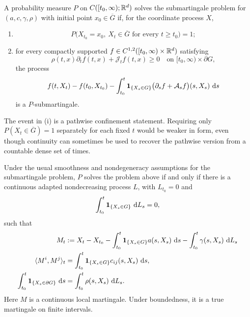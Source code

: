 \begin{definition}
A probability measure $P$ on
$C([t_0,\infty);\mathbb R^d)$ solves the submartingale problem for
$(a,c,\gamma,\rho)$ with initial point $x_0\in\overline G$ if, for the
coordinate process $X$,
\begin{enumerate}[label=(\roman*)]
  \item
  \[
    P\bigl(X_{t_0}=x_0,
      \ X_t\in\overline G\text{ for every }t\geq t_0\bigr)=1;
  \]
  \item for every compactly supported
  $f\in C^{1,2}([t_0,\infty)\times\mathbb R^d)$ satisfying
  \begin{equation}
    \rho(t,x)\partial_t f(t,x)+\mathcal J_t f(t,x)\geq0
    \quad\text{on }[t_0,\infty)\times\partial G, \label{eq:submart-boundary-test}
  \end{equation}
  the process
  \begin{align}
    f(t,X_t)-f(t_0,X_{t_0})
    -\int_{t_0}^t\mathbf 1_{\{X_s\in G\}}
       \bigl(\partial_s f+\mathcal A_s f\bigr)(s,X_s)\,\mathop{}\!\mathrm d s
       \label{eq:submart-process}
  \end{align}
  is a $P$-submartingale.
\end{enumerate}
\end{definition}

The event in (i) is a pathwise confinement statement. Requiring only
$P(X_t\in\overline G)=1$ separately for each fixed $t$ would be weaker in
form, even though continuity can sometimes be used to recover the pathwise
version from a countable dense set of times.

\begin{theorem}
Under the usual smoothness and nondegeneracy assumptions for the
submartingale problem, $P$ solves the problem above if and only if there is a
continuous adapted nondecreasing process $L$, with $L_{t_0}=0$ and
\begin{equation}
  \int_{t_0}^t\mathbf 1_{\{X_s\in G\}}\,\mathop{}\!\mathrm d L_s=0, \label{eq:l-support-ch3}
\end{equation}
such that
\begin{align}
  M_t
  &:=X_t-X_{t_0}
     -\int_{t_0}^t\mathbf 1_{\{X_s\in G\}}a(s,X_s)\,\mathop{}\!\mathrm d s
     -\int_{t_0}^t\gamma(s,X_s)\,\mathop{}\!\mathrm d L_s \label{eq:submart-M}\\
  \langle M^i,M^j\rangle_t
  &=\int_{t_0}^t\mathbf 1_{\{X_s\in G\}}c_{ij}(s,X_s)\,\mathop{}\!\mathrm d s, \label{eq:submart-bracket}\\
  \int_{t_0}^t\mathbf 1_{\{X_s\in\partial G\}}\,\mathop{}\!\mathrm d s
  &=\int_{t_0}^t\rho(s,X_s)\,\mathop{}\!\mathrm d L_s. \label{eq:elastic-relation}
\end{align}
Here $M$ is a continuous local martingale. Under boundedness, it is a true
martingale on finite intervals.
\end{theorem}

